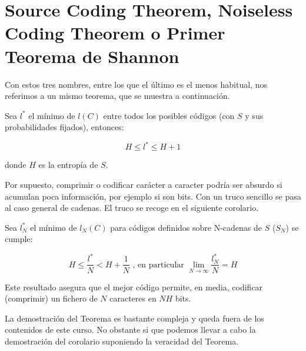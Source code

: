 \section{Source Coding Theorem, Noiseless Coding Theorem o Primer Teorema de Shannon}

	Con estos tres nombres, entre los que el último es el menos habitual, nos referimos a un mismo teorema, que se muestra a continuación.

	\begin{theorem}
		Sea $l^*$ el mínimo de $l(C)$ entre todos los posibles códigos (con $S$ y sus probabilidades fijados), entonces:

		$$ H \leq l^* \leq H + 1 $$

		donde $H$ es la entropía de $S$.

	\end{theorem}

	Por supuesto, comprimir o codificar carácter a caracter podría ser absurdo si acumulan poca información, por ejemplo si son bits. Con un truco sencillo se pasa al caso general de cadenas. El truco se recoge en el siguiente corolario.

	\begin{corol}
		\label{corolario minima longitud}
		Sea $l^{*}_N$ el mínimo de $l_N(C)$ para códigos definidos sobre N-cadenas de $S$ ($S_N$) se cumple:

		$$ H \leq \frac{l^*}{N} < H + \frac{1}{N} \text{ , en particular  } \lim_{N \rightarrow \infty} \frac{l^*_N}{N} = H$$

		Este resultado asegura que el mejor código permite, en media, codificar (comprimir) un fichero de $N$ caracteres en $NH$ bits.

	\end{corol}

	La demostración del Teorema es bastante compleja y queda fuera de los contenidos de este curso. No obstante si que podemos llevar a cabo la demostración del corolario suponiendo la veracidad del Teorema.

